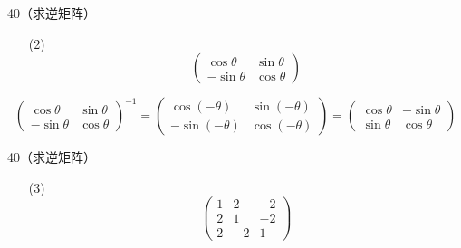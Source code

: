 \begin{frame}
  \begin{footnotesize}
    \begin{li}{40（求逆矩阵）}
      \begin{itemize}
      \item[(2)]
        $$
        \left(
        \begin{array}{rr}
          \cos\theta&\sin\theta\\
          -\sin\theta&\cos\theta
        \end{array}
        \right)
        $$
      \end{itemize}
    \end{li}

    $$
    \left(
    \begin{array}{rr}
      \cos\theta&\sin\theta\\
      -\sin\theta&\cos\theta
    \end{array}
    \right)^{-1}=
    \left(
    \begin{array}{rr}
      \cos(-\theta)&\sin(-\theta)\\
      -\sin(-\theta)&\cos(-\theta)
    \end{array}
    \right)=     \left(
    \begin{array}{rr}
      \cos\theta&-\sin\theta\\
      \sin\theta&\cos\theta
    \end{array}
    \right)
    $$
  \end{footnotesize}
\end{frame}


\begin{frame}
  \begin{footnotesize}
    \begin{li}{40（求逆矩阵）}
      \begin{itemize}
      \item[(3)]
        $$
        \left(
        \begin{array}{rrr}
          1&2&-2\\
          2&1&-2\\
          2&-2&1
        \end{array}
        \right)
        $$
      \end{itemize}
    \end{li}
  \end{footnotesize}
\end{frame}

